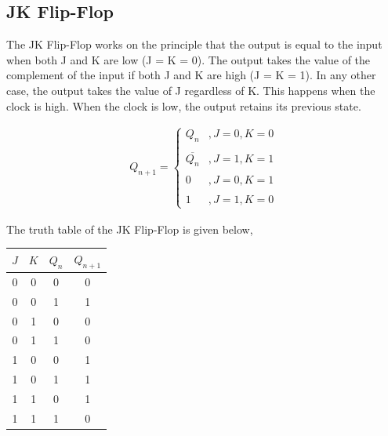 \documentclass{article}
\begin{document}
\subsection{JK Flip-Flop}

\begin{figure}[!ht]
\centering
{}%

\label{fig:my_label}
\end{figure}

The JK Flip-Flop works on the principle that the output is equal to the input when both J and K are low (J = K = 0). The output takes the value of the complement of the input if both J and K are high (J = K = 1). In any other case, the output takes the value of J regardless of K. This happens when the clock is high. When the clock is low, the output retains its previous state.

\begin{align*}
    Q_{n + 1} = 
    \begin{cases}
        Q_n &, J = 0, K = 0\\\\
        \overline{Q_n} &, J = 1, K = 1\\\\
        0 &, J = 0, K = 1\\\\
        1 &, J = 1, K = 0
    \end{cases}
\end{align*}

The truth table of the JK Flip-Flop is given below,\\
\pagebreak
\begin{table}[h!]
\centering
\begin{tabular}{|c|c|c|c|}
\hline
$J$ & $K$ & $Q_n$ & $Q_{n+1}$ \\
\hline
0 & 0 & 0 & 0 \\
0 & 0 & 1 & 1 \\
0 & 1 & 0 & 0 \\
0 & 1 & 1 & 0 \\
1 & 0 & 0 & 1 \\
1 & 0 & 1 & 1 \\
1 & 1 & 0 & 1 \\
1 & 1 & 1 & 0 \\
\hline
\end{tabular}
\end{table}
\end{document}
